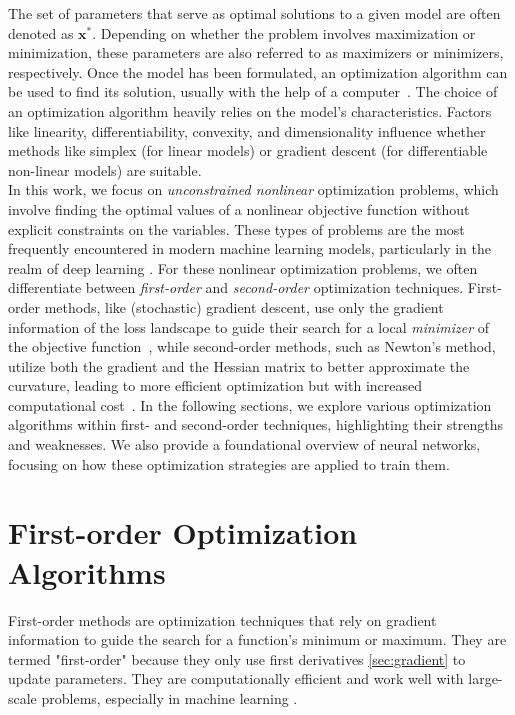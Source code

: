 The set of parameters that serve as optimal solutions to a given model are often denoted as $\mathbf{x^*}$.
Depending on whether the problem involves maximization or minimization, these parameters are also referred to as maximizers or minimizers, respectively.
Once the model has been formulated, an optimization algorithm can be used to
find its solution, usually with the help of a computer~\cite{nocedal2006numerical}. 
The choice of an optimization algorithm heavily relies on the model's characteristics.
Factors like linearity, differentiability, convexity, and dimensionality influence whether methods like simplex (for linear models)
or gradient descent (for differentiable non-linear models) are suitable\cite{sun2019survey}.\\
In this work, we focus on \emph{unconstrained nonlinear } optimization problems, which involve finding the optimal values of a nonlinear objective function 
without explicit constraints on the variables.
These types of problems are the most frequently encountered in modern machine learning models, particularly in the realm of deep learning \cite{Goodfellow-et-al-2016}.
For these nonlinear optimization problems, we often differentiate between \emph{first-order} and \emph{second-order} optimization techniques.
First-order methods, like (stochastic) gradient descent, use only the gradient information of the loss landscape to guide their search for
a local \emph{minimizer} of the objective function~\cite{kashyap2023survey},
while second-order methods, such as Newton's method, utilize both the gradient and the Hessian matrix to better approximate the curvature,
leading to more efficient optimization but with increased computational cost~\cite{yao2021adahessian}.
In the following sections, we explore various optimization algorithms within first- and second-order techniques,
highlighting their strengths and weaknesses.
We also provide a foundational overview of neural networks, focusing on how these optimization strategies are applied to train them. 


\section{First-order Optimization Algorithms}
\label{sec:firstorder}

First-order methods are optimization techniques that rely on gradient information to guide the search for a function's minimum or maximum.
They are termed "first-order" because they only use first derivatives \ref{sec:gradient} to update parameters.
They are computationally efficient and work well with large-scale problems, especially in machine learning \cite{Goodfellow-et-al-2016}.
